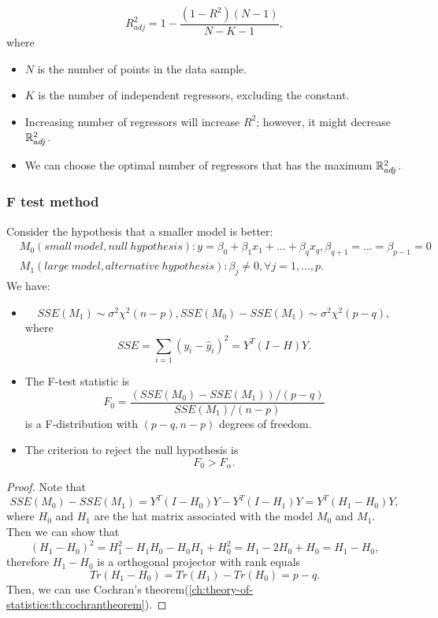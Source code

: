 \begin{refsection}
\begin{definition}
	$$R^2_{adj} = 1 - \frac{(1-R^2)(N-1)}{N-K-1},$$
	where \begin{itemize}
		\item $N$ is the number of points in the data sample.
		\item $K$ is the number of independent regressors, excluding the constant.
	\end{itemize}	
\end{definition}


\begin{remark}[interpretation]\hfill
	\begin{itemize}
		\item Increasing number of regressors will increase $R^2$; however, it might decrease $\mathbb{R}^2_{adj}$.
		\item We can choose the optimal number of regressors that has the maximum $\mathbb{R}_{adj}^2$.
	\end{itemize}	
\end{remark}

\subsubsection{F test method}
\begin{theorem}\label{ch:regression-analysis:th:FTestLinearModelSelection}
	Consider the hypothesis that a smaller model is better: 
	\begin{align*}
	&M_0(small~model, null~hypothesis): y = \beta_0 + \beta_1x_1 + ... + \beta_{q}x_q, \beta_{q+1} = ... = \beta_{p-1} = 0\\
	&M_1(large~model, alternative~hypothesis): \beta_j \neq 0,\forall j=1,...,p.
	\end{align*}
	We have:
	\begin{itemize}
		\item  $$SSE(M_1)\sim \sigma^2\chi^2(n-p),SSE(M_0) - SSE(M_1) \sim \sigma^2\chi^2(p-q),$$
		where $$SSE= \sum_{i=1} (y_i - \hat{y}_i)^2 = Y^T(I - H)Y.$$
		\item The F-test statistic is
		$$F_0 = \frac{(SSE(M_0)-SSE(M_1))/(p-q)}{SSE(M_1)/(n-p)}$$
		is a F-distribution with $(p-q,n-p)$ degrees of freedom.\\
		\item The criterion to reject the null hypothesis is $$F_0 > F_\alpha.$$
	\end{itemize}
\end{theorem}
\begin{proof}
	Note that $$SSE(M_0) - SSE(M_1) = Y^T(I-H_0)Y - Y^T(I-H_1)Y = Y^T(H_1-H_0)Y,$$
	where $H_0$ and $H_1$ are the hat matrix associated with the model $M_0$ and $M_1$. Then we can show that
	$$(H_1-H_0)^2=H_1^2-H_1H_0-H_0H_1 + H_0^2 = H_1 - 2H_0 + H_0 = H_1-H_0,$$
	therefore $H_1-H_0$ is a orthogonal projector with rank equals $$Tr(H_1-H_0) = Tr(H_1)-Tr(H_0) = p-q.$$ Then, we can use Cochran's theorem(\autoref{ch:theory-of-statistics:th:cochrantheorem}).
\end{proof}




\end{refsection}
